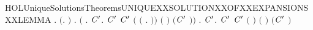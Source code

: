 \begin{SaveVerbatim}{HOLUniqueSolutionsTheoremsUNIQUEXXSOLUTIONXXOFXXEXPANSIONSXXLEMMA}
\HOLTokenTurnstile{} \HOLSymConst{\HOLTokenForall{}} .
       \ensuremath{(}\HOLSymConst{\HOLTokenExists{}}.   \HOLSymConst{\HOLTokenConj{}}     \HOLSymConst{\HOLTokenConj{}}    \ensuremath{)} \HOLSymConst{\HOLTokenImp{}}
       \HOLSymConst{\HOLTokenForall{}}.
             \HOLSymConst{\HOLTokenImp{}}
           \ensuremath{(}\HOLSymConst{\HOLTokenForall{}} .
                  \HOLTokenWeakTransBegin{} \HOLTokenWeakTransEnd {} \HOLSymConst{\HOLTokenImp{}}
                \HOLSymConst{\HOLTokenExists{}}\ensuremath{\HOLBoundVar{C}\sp{\prime}}.
                     \ensuremath{\HOLBoundVar{C}\sp{\prime}} \HOLSymConst{\HOLTokenConj{}}   \ensuremath{\HOLBoundVar{C}\sp{\prime}}  \HOLSymConst{\HOLTokenConj{}}
                    \ensuremath{(}  \ensuremath{(}\HOLTokenLambda{} .  \HOLTokenWeakTransBegin{} \HOLTokenWeakTransEnd {}\ensuremath{)}\ensuremath{)} \ensuremath{(} \ensuremath{)}
                      \ensuremath{(}\ensuremath{\HOLBoundVar{C}\sp{\prime}} \ensuremath{)}\ensuremath{)} \HOLSymConst{\HOLTokenConj{}}
           \HOLSymConst{\HOLTokenForall{}}.
                 \HOLTokenWeakTransBegin\HOLConst{\ensuremath{\tau}}\HOLTokenWeakTransEnd {} \HOLSymConst{\HOLTokenImp{}}
               \HOLSymConst{\HOLTokenExists{}}\ensuremath{\HOLBoundVar{C}\sp{\prime}}.
                    \ensuremath{\HOLBoundVar{C}\sp{\prime}} \HOLSymConst{\HOLTokenConj{}}   \ensuremath{\HOLBoundVar{C}\sp{\prime}}  \HOLSymConst{\HOLTokenConj{}}
                   \ensuremath{(}  \ensuremath{)} \ensuremath{(} \ensuremath{)} \ensuremath{(}\ensuremath{\HOLBoundVar{C}\sp{\prime}} \ensuremath{)}
\end{SaveVerbatim}
\newcommand{\HOLUniqueSolutionsTheoremsUNIQUEXXSOLUTIONXXOFXXEXPANSIONSXXLEMMA}{\UseVerbatim{HOLUniqueSolutionsTheoremsUNIQUEXXSOLUTIONXXOFXXEXPANSIONSXXLEMMA}}
